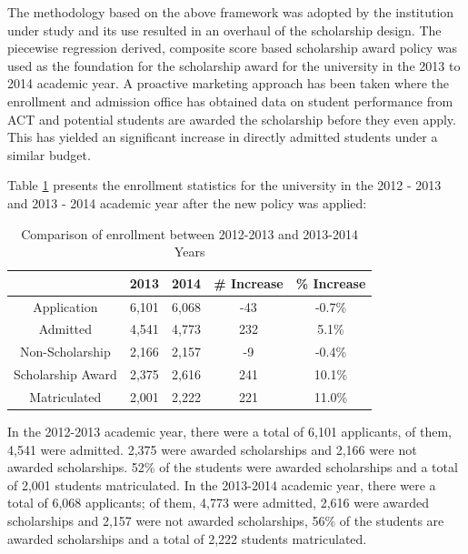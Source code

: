 \documentclass[12pt,english]{report}
\begin{document}
The methodology based on the above framework was adopted by the institution under study and its use resulted in an overhaul of the scholarship design. The piecewise regression derived, composite score based scholarship award policy was used as the foundation for the scholarship award for the university in the 2013 to 2014 academic year. A proactive marketing approach has been taken where the enrollment and admission office has obtained data on student performance from ACT and potential students are awarded the scholarship before they even apply. This has yielded an significant increase in directly admitted students under a similar budget. 

Table \ref{enroll_stats1} presents the enrollment statistics for the university in the 2012 - 2013 and 2013 - 2014 academic year after the new policy was applied:

\begin{table}[H]
\centering
\begin{tabular}{|c|c|c|c|c|}
\hline
& 2013 & 2014 & \# Increase & \% Increase \\ \hline
Application                    & 6,101 & 6,068 & -43         & -0.7\%      \\ \hline
Admitted                       & 4,541 & 4,773 & 232         & 5.1\%       \\ \hline
Non-Scholarship                & 2,166 & 2,157 & -9          & -0.4\%      \\ \hline
Scholarship Award              & 2,375 & 2,616 & 241         & 10.1\%      \\ \hline
Matriculated                   & 2,001 & 2,222 & 221         & 11.0\%      \\ \hline
\end{tabular}
\caption{ Comparison of enrollment between 2012-2013 and 2013-2014 Years}
\label{enroll_stats1}
\end{table}

In the 2012-2013 academic year, there were a total of 6,101 applicants, of them, 4,541 were admitted. 2,375 were awarded scholarships and 2,166 were not awarded scholarships. 52\% of the students were awarded scholarships and a total of 2,001 students matriculated. In the 2013-2014 academic year, there were a total of 6,068 applicants; of them, 4,773 were admitted, 2,616 were awarded scholarships and 2,157 were not awarded scholarships, 56\% of the students are awarded scholarships and a total of 2,222 students matriculated.
\end{document}

